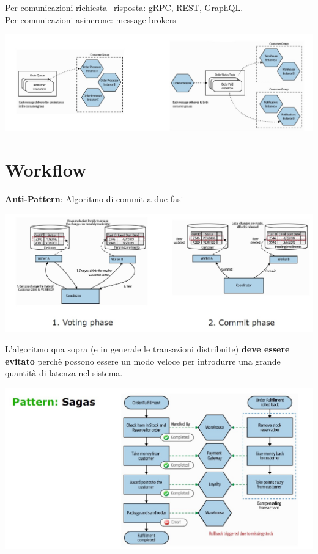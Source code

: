 Per comunicazioni richiesta$-$risposta: gRPC, REST, GraphQL.\\
Per comunicazioni asincrone: message brokers 
\begin{center}
    \includegraphics[scale = 0.4]{Images/SOA/ImplementingMicroserviceComm.jpg}
\end{center}

\section{Workflow}
\textbf{Anti-Pattern}: Algoritmo di commit a due fasi
\begin{center}
    \includegraphics[scale = 0.4]{Images/SOA/WorkFlow.jpg}
\end{center}
L'algoritmo qua sopra (e in generale le transazioni distribuite) \textbf{deve essere evitato} perchè possono essere un modo veloce per introdurre una grande quantità di latenza nel sistema. 
\begin{center}
    \includegraphics[scale = 0.4]{Images/SOA/PatternSagas.jpg}
\end{center}

